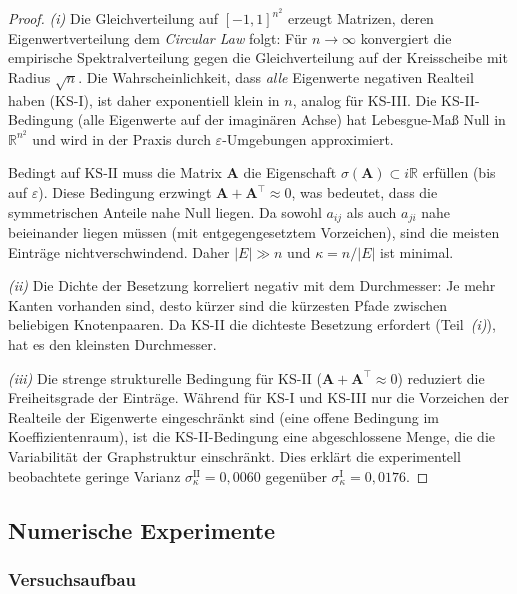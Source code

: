 \documentclass[a4paper, 12pt, twoside, openright]{report}
\theoremstyle{definition}
\theoremstyle{definition}
\newcommand{\R}{\mathbb{R}}
\newcommand{\vA}{\bm{A}}
\newcommand{\T}{\top}
\newcommand{\spec}{\sigma}
\newcommand{\KS}{\mathrm{KS}}
\begin{document}
\begin{proof}
\textit{(i)} Die Gleichverteilung auf $[-1,1]^{n^2}$ erzeugt Matrizen, deren
Eigenwertverteilung dem \emph{Circular Law} folgt: Für $n \to \infty$ konvergiert
die empirische Spektralverteilung gegen die Gleichverteilung auf der Kreisscheibe
mit Radius $\sqrt{n}$. Die Wahrscheinlichkeit, dass \emph{alle} Eigenwerte
negativen Realteil haben (KS-I), ist daher exponentiell klein in $n$, analog
für KS-III. Die KS-II-Bedingung (alle Eigenwerte auf der imaginären Achse) hat
Lebesgue-Maß Null in $\R^{n^2}$ und wird in der Praxis durch $\varepsilon$-Umgebungen
approximiert.

Bedingt auf $\KS\text{-II}$ muss die Matrix $\vA$ die Eigenschaft
$\spec(\vA) \subset i\R$ erfüllen (bis auf $\varepsilon$). Diese Bedingung erzwingt
$\vA + \vA^\T \approx 0$, was bedeutet, dass die symmetrischen Anteile nahe Null
liegen. Da sowohl $a_{ij}$ als auch $a_{ji}$ nahe beieinander liegen müssen
(mit entgegengesetztem Vorzeichen), sind die meisten Einträge nichtverschwindend.
Daher $|E| \gg n$ und $\kappa = n/|E|$ ist minimal.

\textit{(ii)} Die Dichte der Besetzung korreliert negativ mit dem Durchmesser:
Je mehr Kanten vorhanden sind, desto kürzer sind die kürzesten Pfade zwischen
beliebigen Knotenpaaren. Da KS-II die dichteste Besetzung erfordert
(Teil~\textit{(i)}), hat es den kleinsten Durchmesser.

\textit{(iii)} Die strenge strukturelle Bedingung für KS-II ($\vA + \vA^\T \approx 0$)
reduziert die Freiheitsgrade der Einträge. Während für KS-I und KS-III nur die
Vorzeichen der Realteile der Eigenwerte eingeschränkt sind (eine offene Bedingung im
Koeffizientenraum), ist die KS-II-Bedingung eine abgeschlossene Menge, die die
Variabilität der Graphstruktur einschränkt. Dies erklärt die experimentell beobachtete
geringe Varianz $\sigma_\kappa^{\mathrm{II}} = 0{,}0060$ gegenüber
$\sigma_\kappa^{\mathrm{I}} = 0{,}0176$.
\end{proof}

\subsection{Numerische Experimente}

\subsubsection{Versuchsaufbau}
\end{document}
